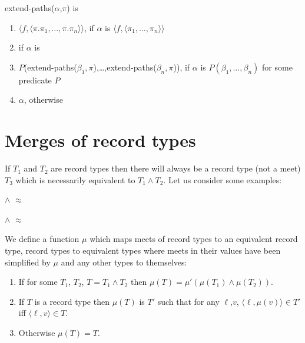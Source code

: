 extend-paths($\alpha$,$\pi$) is
\begin{enumerate} 
 
\item $\langle f, \langle \pi.\pi_1,\ldots,\pi.\pi_n\rangle\rangle$,
  if $\alpha$ is $\langle f, \langle \pi_1,\ldots,\pi_n\rangle\rangle$ 
 
\item {} if $\alpha$
            is 

\item
  $P$(extend-paths($\beta_1,\pi$),\ldots,extend-paths($\beta_n,\pi$)),
  if $\alpha$ is $P(\beta_1,\ldots,\beta_n)$ for some predicate $P$


\item $\alpha$, otherwise
 
\end{enumerate} 


\section{Merges of record types}
\label{app:merge}

If $T_1$ and $T_2$ are record types then there will always be a record
type (not a meet) 
$T_3$ which is necessarily equivalent to $T_1\wedge T_2$.
Let us consider some examples:

$\wedge$
$\approx$ 

$\wedge$
$\approx$ 

\noindent We
define a function $\mu$ which maps meets of record types to an
equivalent record type, record types to equivalent types where meets
in their values have been simplified by $\mu$ and any other types to themselves:
\begin{enumerate} 
 
\item If for some $T_1$, $T_2$, $T=T_1\wedge T_2$ then
  $\mu(T)=\mu'(\mu(T_1)\wedge\mu(T_2))$. 
 
\item If $T$ is a record type then $\mu(T)$ is $T'$ such that for any
  $\ell$,$v$, $\langle\ell,\mu(v)\rangle\in T'$ iff
  $\langle\ell,v\rangle\in T$.

\item Otherwise $\mu(T)=T$.
 
\end{enumerate} 

